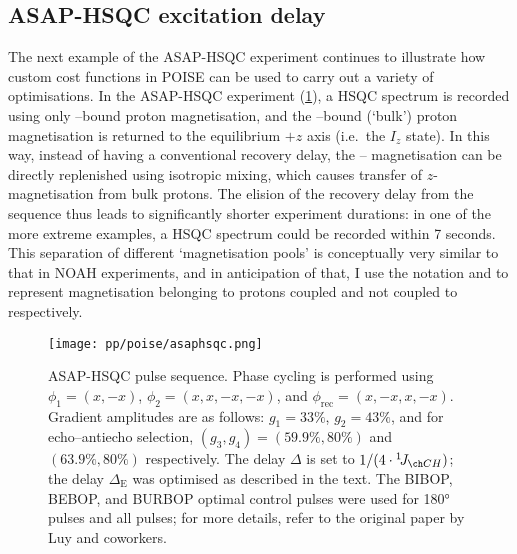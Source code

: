 \subsection{ASAP-HSQC excitation delay}
\label{subsec:poise__asaphsqc}

The next example of the ASAP-HSQC experiment\autocite{SchulzeSunninghausen2014JACS,SchulzeSunninghausen2017JMR,Koos2019JMR,Becker2019JMR} continues to illustrate how custom cost functions in POISE can be used to carry out a variety of optimisations.
In the ASAP-HSQC experiment (\cref{fig:asaphsqc_pulseq}), a HSQC spectrum is recorded using only \carbon{}--bound proton magnetisation, and the \carbont{}--bound (`bulk') proton magnetisation is returned to the equilibrium $+z$ axis (i.e.\ the $I_z$ state).
In this way, instead of having a conventional recovery delay, the \carbon{}--\proton{} magnetisation can be directly replenished using isotropic mixing, which causes transfer of $z$-magnetisation from bulk protons.
The elision of the recovery delay from the sequence thus leads to significantly shorter experiment durations: in one of the more extreme examples, a HSQC spectrum could be recorded within 7 seconds.
This separation of different `magnetisation pools' is conceptually very similar to that in NOAH experiments, and in anticipation of that, I use the notation  and  to represent magnetisation belonging to protons coupled and not coupled to \carbon{} respectively.

\begin{figure}[htb]
    \centering
    \texttt{[image: pp/poise/asaphsqc.png]}
    \caption[ASAP-HSQC pulse sequence]{
        ASAP-HSQC pulse sequence.
        Phase cycling is performed using $\phi_1 = (x, -x)$, $\phi_2 = (x, x, -x, -x)$, and $\phi_\text{rec} = (x, -x, x, -x)$.
        Gradient amplitudes are as follows: $g_1 = 33\%$, $g_2 = 43\%$, and for echo--antiecho selection, $(g_3, g_4) = (59.9\%, 80\%)$ and $(63.9\%, 80\%)$ respectively.
        The delay $\Delta$ is set to $1/(4 \cdot \oneJ{CH})$; the delay $\Delta_\text{E}$ was optimised as described in the text.
        The BIBOP, BEBOP, and BURBOP optimal control pulses\autocite{Kobzar2004JMR,Kobzar2008JMR,Kobzar2012JMR} were used for \proton{} \ang{180} pulses and all \carbon{} pulses; for more details, refer to the original paper by Luy and coworkers\autocite{SchulzeSunninghausen2014JACS}.
    }
    \label{fig:asaphsqc_pulseq}
\end{figure}

